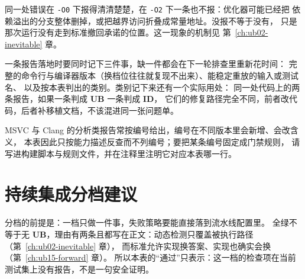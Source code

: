 \documentclass[12pt,a4paper,fontset=fandol]{ctexbook}
\newcommand{\Tp}[1]{\texttt{#1}}
\newcommand{\UB}{\textbf{\textsf{UB}}}
\newcommand{\IDB}{\textbf{\textsf{ID}}}
\newcommand{\Mx}[1]{\textsf{#1}}
\begin{document}
\begin{warning}[title=报告形态会消失]
同一处错误在 \Tp{-O0} 下报得清清楚楚，在 \Tp{-O2} 下一条也不报：优化器可能已经把
依赖溢出的分支整体删掉，或把越界访问折叠成常量地址。没报不等于没有，
只是那次运行没有走到标准撤回承诺的位置。这一现象的机制见 第~\ref{ch:ub02-inevitable} 章。
\end{warning}

一条报告落地时要同时记下三件事，缺一件都会在下一轮排查里重新花时间：
完整的命令行与编译器版本（换档位往往就复现不出来）、能稳定重放的输入或测试名、
以及按本表判出的类别。类别记下来还有一个实际用处：
同一处代码上的两条报告，如果一条判成 \UB{} 一条判成 \IDB{}，
它们的修复路径完全不同，前者改代码，后者补移植文档，不该混进同一张问题单。

\Mx{MSVC} 与 \Mx{Clang} 的分析类报告常按编号给出，编号在不同版本里会新增、会改含义，
本表因此只按能力描述反查而不列编号；要把某条编号固定成门禁规则，
请写进构建脚本与规则文件，并在注释里注明它对应本表哪一行。

\section{持续集成分档建议}

\begin{guideline}[title=分档表怎么用]
分档的前提是：一档只做一件事，失败策略要能直接落到流水线配置里。
全绿不等于无 \UB{}，理由有两条且都写在正文：动态检测只覆盖被执行路径（第~\ref{ch:ub02-inevitable} 章），
而标准允许实现换答案、实现也确实会换（第~\ref{ch:ub15-forward} 章）。
所以本表的“通过”只表示：这一档的检查项在当前测试集上没有报告，不是一句安全证明。
\end{guideline}
\end{document}
